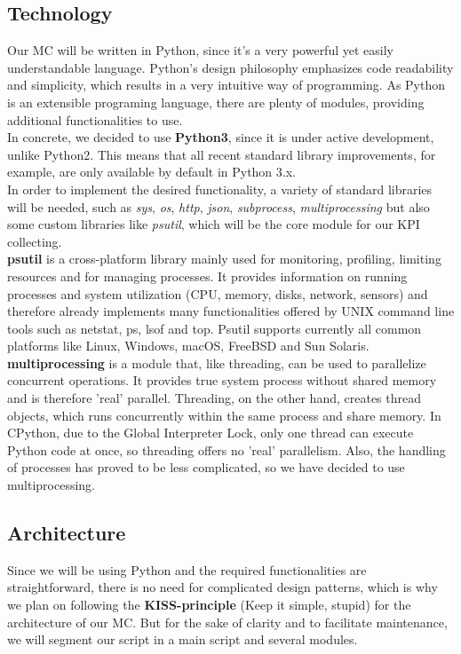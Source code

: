 \documentclass{scrreprt}
\begin{document}
\subsection{Technology}
Our MC will be written in Python, since it's a very powerful yet easily understandable language. Python's design philosophy emphasizes code readability and simplicity, which results in a very intuitive way of programming. As Python is an extensible programing language, there are plenty of modules, providing additional functionalities to use. \\
In concrete, we decided to use \textbf{Python3}, since it is under active development, unlike Python2. This means that all recent standard library improvements, for example, are only available by default in Python 3.x. \\
In order to implement the desired functionality, a variety of standard libraries will be needed, such as \textit{sys}, \textit{os}, \textit{http}, \textit{json}, \textit{subprocess}, \textit{multiprocessing} but also some custom libraries like \textit{psutil}, which will be the core module for our KPI collecting. \\
\textbf{psutil} is a cross-platform library mainly used for monitoring, profiling, limiting resources and for managing processes. It provides information on running processes and system utilization (CPU, memory, disks, network, sensors) and therefore already implements many functionalities offered by UNIX command line tools such as netstat, ps, lsof and top. Psutil supports currently all common platforms like Linux, Windows, macOS, FreeBSD and Sun Solaris. \\
\textbf{multiprocessing} is a module that, like threading, can be used to parallelize concurrent operations. It provides true system process without shared memory and is therefore 'real' parallel. Threading, on the other hand, creates thread objects, which runs concurrently within the same process and share memory. In CPython, due to the Global Interpreter Lock, only one thread can execute Python code at once, so threading offers no 'real' parallelism. Also, the handling of processes has proved to be less complicated, so we have decided to use multiprocessing.
\subsection{Architecture}
Since we will be using Python and the required functionalities are straightforward, there is no need for complicated design patterns, which is why we plan on following the \textbf{KISS-principle} (Keep it simple, stupid) for the architecture of our MC.  
But for the sake of clarity and to facilitate maintenance, we will segment our script in a main script and several modules.
\end{document}
